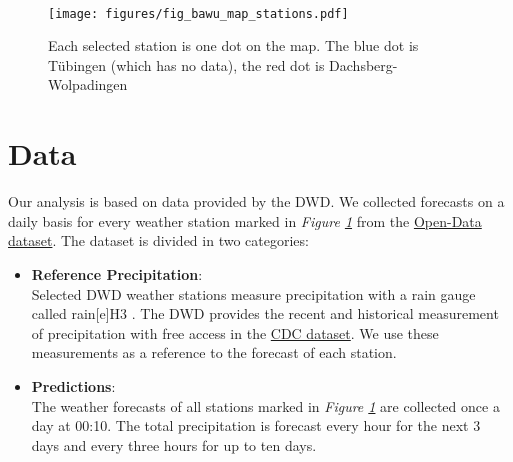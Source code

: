 \documentclass{article}
\theoremstyle{plain}
\theoremstyle{definition}
\theoremstyle{remark}
\begin{document}


\\

\begin{figure}[h]
    \centering
    \label{fig:bw-stations}
    \texttt{[image: figures/fig\_bawu\_map\_stations.pdf]}
    \caption{Each selected station is one dot on the map. The blue dot is Tübingen (which has no data), the red dot is Dachsberg-Wolpadingen}
\end{figure}


\section{Data}\label{sec:Data}
Our analysis is based on data provided by the DWD. We collected forecasts on a daily basis for every weather station marked in \textit{Figure \ref{fig:bw-stations}} from the \href{https://opendata.dwd.de/climate_environment/CDC/}{Open-Data dataset}. The dataset is divided in two categories:
\begin{itemize}
    \item \textbf{Reference Precipitation}:\\
    Selected DWD weather stations measure precipitation with a rain gauge called rain[e]H3 \cite{rain-e}. The DWD provides the recent and historical measurement of precipitation with free access in the \href{https://opendata.dwd.de/climate_environment/CDC/observations_germany/climate/hourly/precipitation/}{CDC dataset}. We use these measurements as a reference to the forecast of each station. 

    \item \textbf{Predictions}:\\
    The weather forecasts of all stations marked in \textit{Figure \ref{fig:bw-stations}} are collected once a day at 00:10. The total precipitation is forecast every hour for the next 3 days and every three hours for up to ten days.
\end{itemize}
\end{document}
